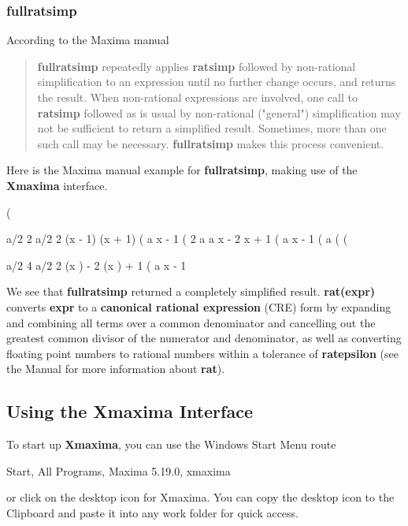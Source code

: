 \documentclass[11pt]{article}
\begin{document}
\subsubsection*{\textbf{fullratsimp}}
According to the Maxima manual
\begin{quote}
\textbf{fullratsimp} repeatedly applies \textbf{ratsimp} followed
  by non-rational simplification to an expression until no further 
  change occurs, and returns the result. 
When non-rational expressions are involved, one call to \textbf{ratsimp}
  followed as is usual by non-rational ("general") simplification may not 
  be sufficient to return a simplified result.
Sometimes, more than one such call may be necessary.
\textbf{fullratsimp} makes this process convenient. 
\end{quote}
Here is the Maxima manual example for \textbf{fullratsimp}, making use of
  the \textbf{Xmaxima} interface.
\begin{myVerbatim}
(%

                              a/2     2   a/2     2
                            (x    - 1)  (x    + 1)
(%
                                     a
                                    x  - 1
(%
                                 2 a      a
                                x    - 2 x  + 1
(%
                                     a
                                    x  - 1
(%
                                     a
(%
(%

                              a/2 4       a/2 2
                            (x   )  - 2 (x   )  + 1
(%
                                     a
                                    x  - 1
\end{myVerbatim}
We see that \textbf{fullratsimp} returned a completely simplified result.
\textbf{rat(expr)} converts \textbf{expr} to a \textbf{canonical rational expression} (CRE)
   form by expanding and combining all terms over a common denominator
   and cancelling out the greatest common divisor of the numerator and
   denominator, as well as converting floating point numbers to rational 
   numbers within a tolerance of \textbf{ratepsilon} (see the Manual for more
   information about \textbf{rat}).
\newpage
\subsection{Using the \textbf{Xmaxima} Interface}
To start up \textbf{Xmaxima}, you can use the Windows Start Menu route
\begin{myVerbatim2s}
 Start, All Programs, Maxima 5.19.0, xmaxima
\end{myVerbatim2s}
  or click on the desktop icon for Xmaxima.
You can copy the desktop icon to the Clipboard and paste it into
  any work folder for quick access.\\
  
\end{document}

